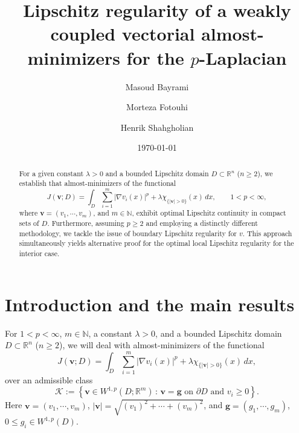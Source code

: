 \documentclass{amsart}
\title[vectorial almost-minimizers]{Lipschitz regularity of a weakly coupled vectorial almost-minimizers for the $p$-Laplacian}
\author[M. Bayrami]{Masoud Bayrami}
\author[M. Fotouhi]{Morteza Fotouhi}
\author[H. Shahgholian]{Henrik Shahgholian}
\date{\today}
\newcommand{\cK}{{\mathcal K}}
\newcommand{\bR}{{\mathbb R}}
\begin{document}
\begin{abstract}

For a given constant $\lambda > 0$ and a bounded Lipschitz domain $D \subset \mathbb{R}^n$ ($n \geq 2$), we establish that almost-minimizers of the functional
$$
 J(\mathbf{v}; D) = \int_D \sum_{i=1}^{m} \left|\nabla v_i(x) \right|^p+ \lambda \chi_{\{\left|\mathbf{v} \right|>0\}} (x) \, dx, \qquad 1<p<\infty,
 $$
where $\mathbf{v} = (v_1, \cdots, v_m)$, and $m \in \mathbb{N}$, exhibit optimal Lipschitz continuity in compact sets of $D$.
Furthermore, assuming $p \geq 2$ and employing a distinctly different methodology, we tackle the issue of boundary Lipschitz regularity for $v$. This approach simultaneously yields alternative proof for the optimal local Lipschitz regularity for the interior case.

\end{abstract}









\maketitle

\tableofcontents

\section{Introduction and the main results}

For $1<p<\infty$, $m\in \mathbb{N}$, a constant $\lambda>0$, and a bounded Lipschitz domain $D \subset \bR^n$ ($n \geq 2$), we will deal with  almost-minimizers of the  functional
\begin{equation}
\label{E0}
J(\mathbf{v}; D) = \int_D \sum_{i=1}^{m} \left|\nabla v_i(x) \right|^p + \lambda \chi_{\{ \left|\mathbf{v} \right|>0\}} (x) \, dx, 
\end{equation}
over  an admissible class 
$$ \cK:=\left\{ \mathbf{v} \in W^{1,p}(D; \mathbb{R}^m) \, : \, \text{$\mathbf{v}=\mathbf{g}$ on $\partial D$ and $v_i \geq 0$} \right\}. $$
Here $\mathbf{v}=(v_1, \cdots, v_m)$,  $|\mathbf{v}|=\sqrt{(v_1)^2+ \cdots + (v_m)^2}$,  and 
 $\mathbf{g}=(g_1,\cdots, g_m)$, $0\le g_i \in W^{1,p}(D)$. 
\end{document}
